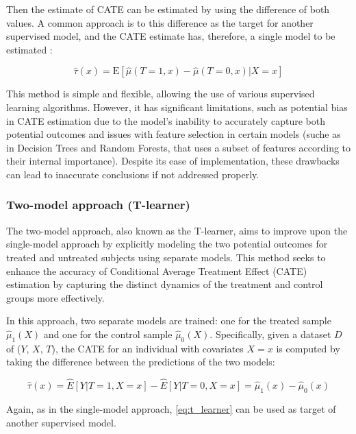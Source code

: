 Then the estimate of CATE can be estimated by using the difference of both values. A common approach is to this difference as the target for another supervised model, and the CATE estimate
has, therefore, a single model to be estimated :

\begin{equation}
  \hat{\tau}(x) = \text{E}[\hat{\mu}(T = 1, x) - \hat{\mu}(T = 0, x) | X = x]
  \label{eq:s_learner_cate_estimator}
\end{equation}

This method is simple and flexible, allowing the use of various supervised learning algorithms. However, it has significant limitations, such as potential bias in CATE estimation due to the model’s 
inability to accurately capture both potential outcomes and issues with feature selection in certain models (suche as in Decision Trees and Random Forests, that uses a subset of features according to their internal importance). Despite its ease of implementation, 
these drawbacks can lead to inaccurate conclusions if not addressed properly.

\subsubsection{Two-model approach (T-learner)}

The two-model approach, also known as the T-learner, aims to improve upon the single-model approach by explicitly modeling the two potential outcomes for treated and untreated subjects using separate models. 
This method seeks to enhance the accuracy of Conditional Average Treatment Effect (CATE) estimation by capturing the distinct dynamics of the treatment and control groups more effectively.

In this approach, two separate models are trained: one for the treated sample $\hat{\mu}_1(X)$ and one for the control sample $\hat{\mu}_0(X)$. Specifically, given a dataset $D$ of ($Y$, $X$, $T$), 
the CATE for an individual with covariates $X = x$ is computed by taking the difference between the predictions of the two models:

\begin{equation}
  \hat{\tau}(x) = \hat{E}[Y | T = 1, X = x] - \hat{E}[Y | T = 0, X = x] = \hat{\mu}_1(x) - \hat{\mu}_0(x)
  \label{eq:t_learner}
\end{equation}

Again, as in the single-model approach, \ref{eq:t_learner} can be used as target of another supervised model.


